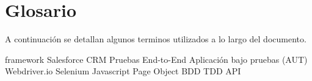 \chapter{Glosario}\label{appendix}
A continuación se detallan algunos terminos utilizados a lo largo del
documento.

framework
Salesforce
CRM
Pruebas End-to-End
Aplicación bajo pruebas (AUT)
Webdriver.io
Selenium
Javascript
Page Object
BDD
TDD
API
